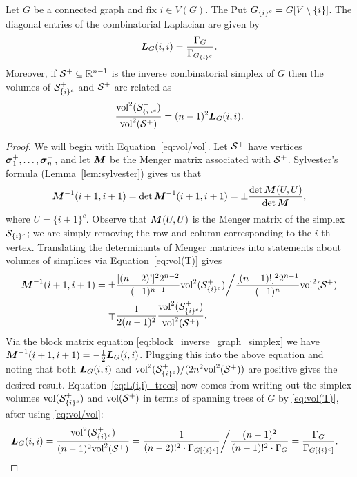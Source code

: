 \begin{lemma}
	\label{lem:L(i,i)_trees}
	Let $G$ be a connected graph and fix $i\in V(G)$. 
	The Put $G_{\{i\}^c}=G[V\setminus \{i\}]$. The diagonal entries of the combinatorial Laplacian are given by 
	\begin{equation}
	\label{eq:L(i,i)_trees}
	\vb*{L}_G(i,i) = \frac{\Gamma_G}{\Gamma_{G_{\{i\}^c}}}.
	\end{equation}
	Moreover, if $\mathcal{S}^+\subseteq\mathbb{R}^{n-1}$  is the inverse combinatorial simplex of $G$ then the volumes
	of $\mathcal{S}^+_{\{i\}^c}$ and $\mathcal{S}^+$ are related as 
	\begin{equation}
	\label{eq:vol/vol}
	\frac{\textnormal{vol}^2(\mathcal{S}_{\{i\}^c}^+)}{\textnormal{vol}^2(\mathcal{S}^+)} = (n-1)^2\vb*{L}_G(i,i). 
	\end{equation}
\end{lemma}
\begin{proof}
	We will begin with Equation~\eqref{eq:vol/vol}. 
	Let $\mathcal{S}^+$ have vertices $\vb*{\sigma}_1^+,\dots,\vb*{\sigma}_n^+$, and let ${\vb*{M}}$ be the Menger matrix associated with $\mathcal{S}^+$. Sylvester's formula (Lemma~\ref{lem:sylvester}) gives us that 
	\begin{equation*}
	\M^{-1}(i+1,i+1) =\det\M^{-1}(i+1,i+1)= \pm \frac{\det\M(U,U)}{\det\M},
	\end{equation*}
	where $U=\{i+1\}^c$. Observe that ${\vb*{M}}(U,U)$ is the Menger matrix of the simplex $\mathcal{S}_{\{i\}^c}$; we are simply removing the row and column corresponding to the $i$-th vertex. Translating the determinants of Menger matrices into statements about volumes of simplices via Equation~\eqref{eq:vol(T)} gives 
	\begin{align*}
	{\vb*{M}}^{-1}(i+1,i+1) &= \pm \frac{[(n-2)!]^2 2^{n-2}}{(-1)^{n-1}}\textnormal{vol}^2(\mathcal{S}_{\{i\}^c}^+) \bigg / \frac{[(n-1)!]^2 2^{n-1}}{(-1)^n} \textnormal{vol}^2(\mathcal{S}^+) \\
	&= \mp \frac{1}{2(n-1)^2}\frac{\textnormal{vol}^2(\mathcal{S}_{\{i\}^c}^+)}{\textnormal{vol}^2(\mathcal{S}^+)}. 
	\end{align*} 
	Via the block matrix equation \eqref{eq:block_inverse_graph_simplex} we have ${\vb*{M}}^{-1}(i+1,i+1) = -\frac{1}{2}\vb*{L}_G(i,i)$. Plugging this into the above equation and noting that both $\vb*{L}_G(i,i)$ and $\textnormal{vol}^2(\mathcal{S}_{\{i\}^c}^+)/(2n^2\textnormal{vol}^2(\mathcal{S}^+))$ are positive  gives the desired result. 
	Equation~\eqref{eq:L(i,i)_trees} now comes from writing out the  simplex volumes $\textnormal{vol}(\mathcal{S}_{\{i\}^c}^+)$ and $\textnormal{vol}(\mathcal{S}^+)$ in terms of spanning trees of $G$ by \eqref{eq:vol(T)}, after using \eqref{eq:vol/vol}:
	\begin{align*}
	\vb*{L}_G(i,i)  &= \frac{\textnormal{vol}^2(\mathcal{S}^+_{\{i\}^c})}{(n-1)^2\textnormal{vol}^2(\mathcal{S}^+)} = \frac{1}{(n-2)!^2\cdot \Gamma_{G[{\{i\}^c}]}} \bigg/ \frac{(n-1)^2}{(n-1)!^2\cdot \Gamma_G} = \frac{\Gamma_{G}}{\Gamma_{G[{\{i\}^c}]}}.\qedhere
	\end{align*}
\end{proof}

